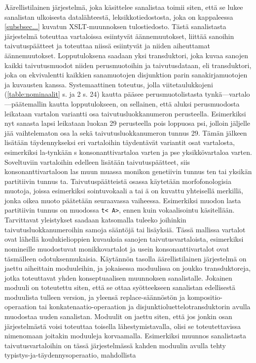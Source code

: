 \documentclass[free]{flammie}
\begin{document}
Äärellistilainen järjestelmä, joka käsittelee sanalistaa toimii siten, että se lukee
sanalistan ulkoisesta datalähteestä, leksikkotiedostosta, joka on kappaleessa
\ref{subsbsec...}
kuvatun XSLT-muunnoksen tulostiedosto. Tästä sanalistasta järjestelmä toteuttaa
vartaloissa esiintyvät äännemuutokset, liittää sanoihin taivutuspäätteet ja toteuttaa
niissä esiintyvät ja niiden aiheuttamat äännemuutokset. Lopputuloksena saadaan
yksi transduktori, joka kuvaa sanojen kaikki taivutusmuodot niiden perusmuotoihin ja taivutusdataan, eli transduktori, joka on ekvivalentti kaikkien sanamuotojen
disjunktion parin sanakirjamuotojen ja kuvausten kanssa.
Systemaattinen toteutus, jolla viitetaulukkojeni (\ref{table:nominaalit} s.
\pageref{table:nominaalit} ja 2 s. 24) kautta pääsee
perusmuotolistasta tynkä—vartalo—päätemallin kautta lopputulokseen, on sellainen, että aluksi perusmuodosta leikataan vartalon variantti osa taivutusluokkanumeron perusteella. Esimerkiksi nyt sanasta lapsi leikataan luokan 29 perusteella
pois loppuosa psi, jolloin jäljelle jää vaihtelematon osa la sekä taivutusluokkanumeron tunnus 29. Tämän jälkeen lisätään täydennykseksi eri vartaloihin täydentävät variantit osat vartalosta, esimerkiksi la-tynkään s konsonanttivartaloa varten ja
pse yksikkövartaloa varten. Soveltuviin vartaloihin edelleen lisätään taivutuspäätteet, siis konsonanttivartaloon las muun muassa monikon genetiivin tunnus ten tai
yksikän partitiivin tunnus ta. Taivutuspäätteistä osassa käytetään morfofonologisia muotoja, joissa esimerkiksi sointuvokaali a tai ä on kuvattu yhteisellä merkillä, jonka oikea muoto päätetään seuraavassa vaiheessa. Esimerkiksi muodon lasta
partitiivin tunnus on muodossa \texttt{t<~A>}, ennen kuin vokaalisointu käsitellään. Tarvittavat yleistykset saadaan katsomalla tuleeko joihinkin taivutusluokkanumeroihin samoja sääntöjä tai lisäyksiä. Tässä mallissa vartalot ovat lähellä koulukielioppien kuvauksia sanojen taivutusvartaloista, esimerkiksi nomineille muodostuvat
monikkovartalot ja usein konsonanttivartalot ovat täsmälleen odotuksenmukaisia.
Käytännön tasolla äärellistilainen järjestelmä on jaettu aiheittain moduuleihin, ja
jokaisessa moduulissa on joukko transduktoreja, jotka toteuttavat yhden konseptuaalisen muunnoksen sanalistalle. Jokainen moduuli on toteutettu siten, että se
ottaa syötteekseen sanalistan edellisestä moduulista tulleen version, ja yleensä
replace-säännöstön ja kompositio-operaation tai konkatenaatio-operaation ja disjunktioluettelotransduktorin avulla muodostaa uuden sanalistan.
Moduulit on jaettu siten, että jos jonkin osan järjestelmästä voisi toteuttaa toisella lähestymistavalla, olisi se toteutettavissa nimenomaan joitakin moduuleja korvaamalla. Esimerkiksi muunnos sanalistasta taivutusvartaloihin on tässä järjestelmässä kahden moduulin avulla tehty typistys-ja-täydennysoperaatio, mahdollista
\end{document}
